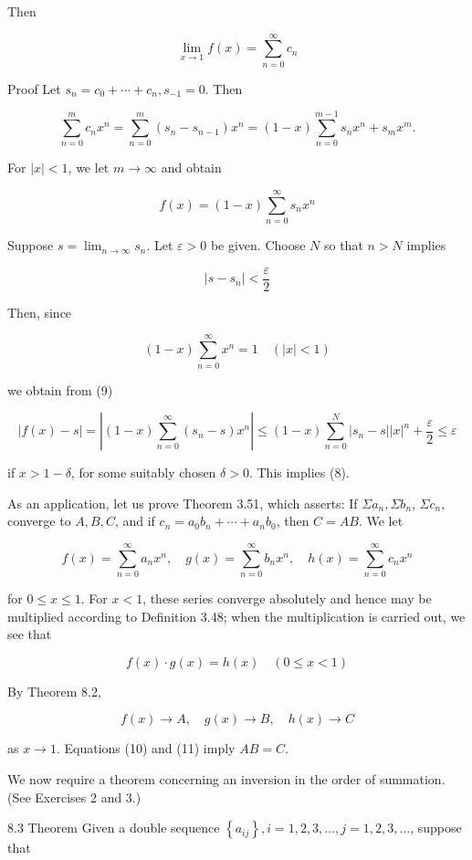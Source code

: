 \documentclass[10pt]{article}
\begin{document}
Then

$$
\lim _{x \rightarrow 1} f(x)=\sum_{n=0}^{\infty} c_{n}
$$

Proof Let $s_{n}=c_{0}+\cdots+c_{n}, s_{-1}=0$. Then

$$
\sum_{n=0}^{m} c_{n} x^{n}=\sum_{n=0}^{m}\left(s_{n}-s_{n-1}\right) x^{n}=(1-x) \sum_{n=0}^{m-1} s_{n} x^{n}+s_{m} x^{m} .
$$

For $|x|<1$, we let $m \rightarrow \infty$ and obtain

$$
f(x)=(1-x) \sum_{n=0}^{\infty} s_{n} x^{n}
$$

Suppose $s=\lim _{n \rightarrow \infty} s_{n}$. Let $\varepsilon>0$ be given. Choose $N$ so that $n>N$ implies

$$
\left|s-s_{n}\right|<\frac{\varepsilon}{2}
$$

Then, since

$$
(1-x) \sum_{n=0}^{\infty} x^{n}=1 \quad(|x|<1)
$$

we obtain from (9)

$$
|f(x)-s|=\left|(1-x) \sum_{n=0}^{\infty}\left(s_{n}-s\right) x^{n}\right| \leq(1-x) \sum_{n=0}^{N}\left|s_{n}-s\right||x|^{n}+\frac{\varepsilon}{2} \leq \varepsilon
$$

if $x>1-\delta$, for some suitably chosen $\delta>0$. This implies (8).

As an application, let us prove Theorem 3.51, which asserts: If $\Sigma a_{n}, \Sigma b_{n}$, $\Sigma c_{n}$, converge to $A, B, C$, and if $c_{n}=a_{0} b_{n}+\cdots+a_{n} b_{0}$, then $C=A B$. We let

$$
f(x)=\sum_{n=0}^{\infty} a_{n} x^{n}, \quad g(x)=\sum_{n=0}^{\infty} b_{n} x^{n}, \quad h(x)=\sum_{n=0}^{\infty} c_{n} x^{n}
$$

for $0 \leq x \leq 1$. For $x<1$, these series converge absolutely and hence may be multiplied according to Definition 3.48; when the multiplication is carried out, we see that

$$
f(x) \cdot g(x)=h(x) \quad(0 \leq x<1)
$$

By Theorem 8.2,

$$
f(x) \rightarrow A, \quad g(x) \rightarrow B, \quad h(x) \rightarrow C
$$

as $x \rightarrow 1$. Equations (10) and (11) imply $A B=C$.

We now require a theorem concerning an inversion in the order of summation. (See Exercises 2 and 3.)

8.3 Theorem Given a double sequence $\left\{a_{i j}\right\}, i=1,2,3, \ldots, j=1,2,3, \ldots$, suppose that
\end{document}
